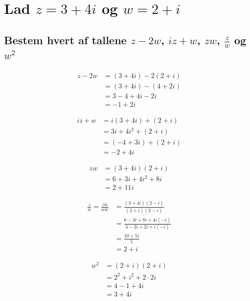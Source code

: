 \documentclass[11pt,a4paper]{article}
\newcommand{\conjugate}[1]{\bar{#1}}
\begin{document}
\section{\mdseries
    Lad $z = 3 + 4i$ og $w = 2 + i$
}

\subsection{\mdseries
    Bestem hvert af tallene $z - 2w$, $iz + w$, $zw$, $\frac{z}{w}$ og $w^2$
}

\begin{multicols}{3}
    
    \begin{align*}
        z - 2w &= (3 + 4i) - 2(2 + i) \\
               &= (3 + 4i) - (4 + 2i) \\
               &= 3 - 4 + 4i - 2i \\
               &= -1 + 2i
    \end{align*}

    \begin{align*}
        iz + w &= i(3 + 4i) + (2 + i) \\
               &= 3i + 4i^2 + (2 + i) \\
               &= (-4 + 3i) + (2 + i) \\
               &= -2 + 4i
    \end{align*}

    \vfill\columnbreak

    \begin{align*}
        zw &= (3 + 4i)(2 + i) \\
           &= 6 + 3i + 4i^2 + 8i \\
           &= 2 + 11i
    \end{align*}

    \begin{align*}
        \frac{z}{w} = \frac{z\conjugate{w}}{w\conjugate{w}}
                   &= \frac{(3 + 4i)(2 - i)}{(2 + i)(2 - i)} \\
                   &= \frac{6 - 3i + 8i + 4i(-i)}{4 - 2i + 2i + i(-i)} \\
                   &= \frac{10 + 5i}{5} \\
                   &= 2 + i
    \end{align*}
    
    \vfill\columnbreak

    \begin{align*}
        w^2 &= (2 + i)(2 + i) \\
            &= 2^2 + i^2 + 2 \cdot 2 i \\
            &= 4 - 1 + 4i \\
            &= 3 + 4i
    \end{align*}

    \vfill

\end{multicols}
\end{document}
